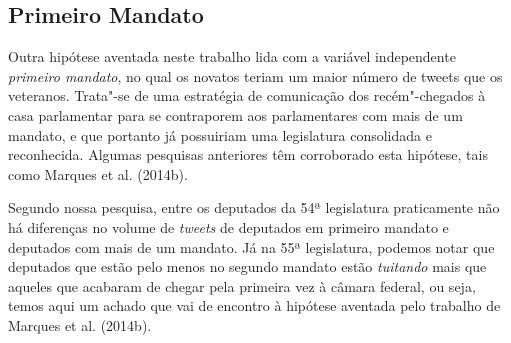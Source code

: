 \subsection{Primeiro Mandato}

Outra hipótese aventada neste trabalho lida com a variável independente
\textit{primeiro mandato}, no qual os novatos teriam um maior número de
tweets que os veteranos. Trata"-se de uma estratégia de comunicação dos
recém"-chegados à casa parlamentar para se contraporem aos parlamentares
com mais de um mandato, e que portanto já possuiriam uma legislatura
consolidada e reconhecida. Algumas pesquisas anteriores têm corroborado
esta hipótese, tais como Marques et al. (2014b).

Segundo nossa pesquisa, entre os deputados da 54ª legislatura
praticamente não há diferenças no volume de \textit{tweets} de deputados
em primeiro mandato e deputados com mais de um mandato. Já na 55ª
legislatura, podemos notar que deputados que estão pelo menos no segundo
mandato estão \textit{tuitando} mais que aqueles que acabaram de chegar
pela primeira vez à câmara federal, ou seja, temos aqui um achado que
vai de encontro à hipótese aventada pelo trabalho de Marques et al.
(2014b).

